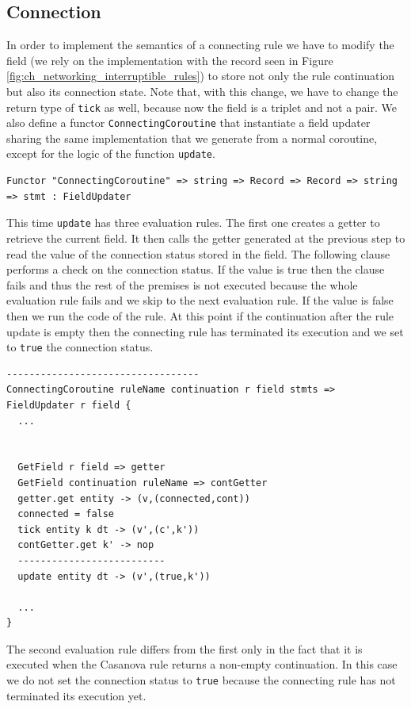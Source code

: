\subsection{Connection}
\label{subsec:ch_networking_connection}
In order to implement the semantics of a connecting rule we have to modify the field (we rely on the implementation with the record seen in Figure \ref{fig:ch_networking_interruptible_rules}) to store not only the rule continuation but also its connection state. Note that, with this change, we have to change the return type of \texttt{tick} as well, because now the field is a triplet and not a pair. We also define a functor \texttt{ConnectingCoroutine} that instantiate a field updater sharing the same implementation that we generate from a normal coroutine, except for the logic of the function \texttt{update}. 

\begin{lstlisting}
Functor "ConnectingCoroutine" => string => Record => Record => string => stmt : FieldUpdater
\end{lstlisting}

\noindent
This time \texttt{update} has three evaluation rules. The first one creates a getter to retrieve the current field. It then calls the getter generated at the previous step to read the value of the connection status stored in the field. The following clause performs a check on the connection status. If the value is true then the clause fails and thus the rest of the premises is not executed because the whole evaluation rule fails and we skip to the next evaluation rule. If the value is false then we run the code of the rule. At this point if the continuation after the rule update is empty then the connecting rule has terminated its execution and we set to \texttt{true} the connection status. 

\begin{lstlisting}
----------------------------------
ConnectingCoroutine ruleName continuation r field stmts => FieldUpdater r field {
  ...
  
  
  GetField r field => getter
  GetField continuation ruleName => contGetter
  getter.get entity -> (v,(connected,cont))
  connected = false
  tick entity k dt -> (v',(c',k'))
  contGetter.get k' -> nop
  --------------------------
  update entity dt -> (v',(true,k'))
  
  ...
}
\end{lstlisting}

\noindent
The second evaluation rule differs from the first only in the fact that it is executed when the Casanova rule returns a non-empty continuation. In this case we do not set the connection status to \texttt{true} because the connecting rule has not terminated its execution yet.

